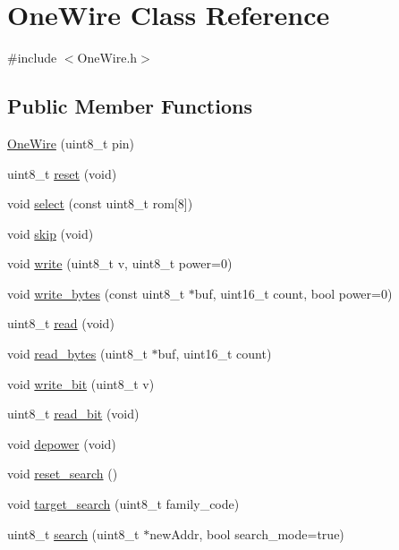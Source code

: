 \hypertarget{class_one_wire}{}\section{One\+Wire Class Reference}
\label{class_one_wire}


{\ttfamily \#include $<$One\+Wire.\+h$>$}

\subsection*{Public Member Functions}
\begin{DoxyCompactItemize}
\item 
\hyperlink{class_one_wire_aa3f23dc51d861a8d257648c507b14e8d}{One\+Wire} (uint8\+\_\+t pin)
\item 
uint8\+\_\+t \hyperlink{class_one_wire_a6a742a9112392567eae3d06dde067c07}{reset} (void)
\item 
void \hyperlink{class_one_wire_accf808390abd63d3c7bce35677784384}{select} (const uint8\+\_\+t rom\mbox{[}8\mbox{]})
\item 
void \hyperlink{class_one_wire_ae3780e2b0ea2ebf6be88298412ac7798}{skip} (void)
\item 
void \hyperlink{class_one_wire_a843e9e7e57ed615b4880be0b76b40b7d}{write} (uint8\+\_\+t v, uint8\+\_\+t power=0)
\item 
void \hyperlink{class_one_wire_a0fc1e0bdc2ab1f062c98567fa60a69ae}{write\+\_\+bytes} (const uint8\+\_\+t $\ast$buf, uint16\+\_\+t count, bool power=0)
\item 
uint8\+\_\+t \hyperlink{class_one_wire_afd9bdb8b5a5b69b394dfc76352e00e21}{read} (void)
\item 
void \hyperlink{class_one_wire_a2407440e8e25b624617593f8ad6447d4}{read\+\_\+bytes} (uint8\+\_\+t $\ast$buf, uint16\+\_\+t count)
\item 
void \hyperlink{class_one_wire_a6bbc58276d1cb08653dab3ea35378f94}{write\+\_\+bit} (uint8\+\_\+t v)
\item 
uint8\+\_\+t \hyperlink{class_one_wire_aeae4c2798b70d9d0ba3091c03ee2d056}{read\+\_\+bit} (void)
\item 
void \hyperlink{class_one_wire_aa8e0f62e830ad05d8035e55c7a309256}{depower} (void)
\item 
void \hyperlink{class_one_wire_aae5efdf67928b5ee312ab7d7906416fa}{reset\+\_\+search} ()
\item 
void \hyperlink{class_one_wire_a0a1b8457adb609a693b865dd474e5116}{target\+\_\+search} (uint8\+\_\+t family\+\_\+code)
\item 
uint8\+\_\+t \hyperlink{class_one_wire_ad84f9ed7a1b2617f580d0d1e96c52cac}{search} (uint8\+\_\+t $\ast$new\+Addr, bool search\+\_\+mode=true)
\end{DoxyCompactItemize}
